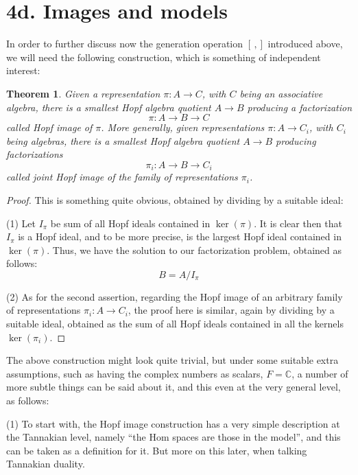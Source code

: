 \documentclass[12pt]{amsbook}
\newtheorem{theorem}{Theorem}[chapter]
\begin{document}
\section*{4d. Images and models}

In order to further discuss now the generation operation $[\,,]$ introduced above, we will need the following construction, which is something of independent interest:


\begin{theorem}
Given a representation $\pi:A\to C$, with $C$ being an associative algebra, there is a smallest Hopf algebra quotient $A\to B$ producing a factorization
$$\pi:A\to B\to C$$
called Hopf image of $\pi$. More generally, given representations $\pi:A\to C_i$, with $C_i$ being algebras, there is a smallest Hopf algebra quotient $A\to B$ producing factorizations
$$\pi_i:A\to B\to C_i$$
called  joint Hopf image of the family of representations $\pi_i$.
\end{theorem}

\begin{proof}
This is something quite obvious, obtained by dividing by a suitable ideal:

\medskip

(1) Let $I_\pi$ be sum of all Hopf ideals contained in $\ker(\pi)$. It is clear then that $I_\pi$ is a Hopf ideal, and to be more precise, is  the largest Hopf ideal contained in $\ker(\pi)$. Thus, we have the solution to our factorization problem, obtained as follows:
$$B=A/I_\pi$$

(2) As for the second assertion, regarding the Hopf image of an arbitrary family of representations $\pi_i:A\to C_i$, the proof here is similar, again by dividing by a suitable ideal, obtained as the sum of all Hopf ideals contained in all the kernels $\ker(\pi_i)$.
\end{proof}

The above construction might look quite trivial, but under some suitable extra assumptions, such as having the complex numbers as scalars, $F=\mathbb C$, a number of more subtle things can be said about it, and this even at the very general level, as follows:

\bigskip

(1) To start with, the Hopf image construction has a very simple description at the Tannakian level, namely ``the Hom spaces are those in the model'', and this can be taken as a definition for it. But more on this later, when talking Tannakian duality.
\end{document}
